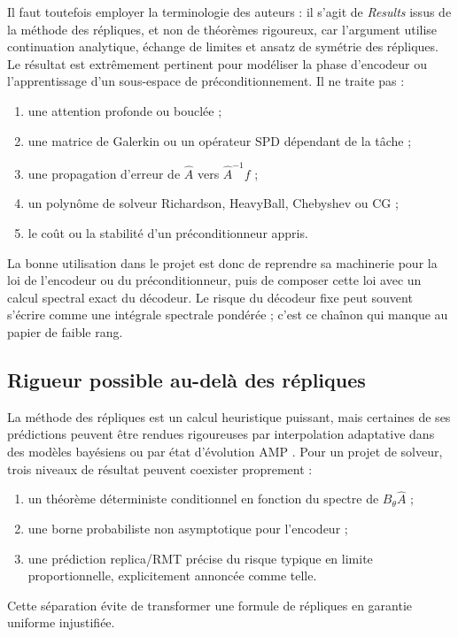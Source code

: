 \documentclass[11pt,a4paper]{article}
\begin{document}
Il faut toutefois employer la terminologie des auteurs : il s'agit de
\emph{Results} issus de la méthode des répliques, et non de théorèmes rigoureux,
car l'argument utilise continuation analytique, échange de limites et ansatz de
symétrie des répliques. Le résultat est extrêmement pertinent pour modéliser la
phase d'encodeur ou l'apprentissage d'un sous-espace de préconditionnement. Il
ne traite pas :
\begin{enumerate}[leftmargin=*]
  \item une attention profonde ou bouclée ;
  \item une matrice de Galerkin ou un opérateur SPD dépendant de la tâche ;
  \item une propagation d'erreur de $\widehat A$ vers $\widehat A^{-1}f$ ;
  \item un polynôme de solveur Richardson, HeavyBall, Chebyshev ou CG ;
  \item le coût ou la stabilité d'un préconditionneur appris.
\end{enumerate}

La bonne utilisation dans le projet est donc de reprendre sa machinerie pour
la loi de l'encodeur ou du préconditionneur, puis de composer cette loi avec un
calcul spectral exact du décodeur. Le risque du décodeur fixe peut souvent
s'écrire comme une intégrale spectrale pondérée ; c'est ce chaînon qui manque
au papier de faible rang.

\subsection{Rigueur possible au-delà des répliques}

La méthode des répliques est un calcul heuristique puissant, mais certaines de
ses prédictions peuvent être rendues rigoureuses par interpolation adaptative
dans des modèles bayésiens ou par état d'évolution AMP
\cite{barbier2019adaptive,bayati2011amp}. Pour un projet de solveur, trois
niveaux de résultat peuvent coexister proprement :
\begin{enumerate}[leftmargin=*]
  \item un théorème déterministe conditionnel en fonction du spectre de
  $B_\theta\widehat A$ ;
  \item une borne probabiliste non asymptotique pour l'encodeur ;
  \item une prédiction replica/RMT précise du risque typique en limite
  proportionnelle, explicitement annoncée comme telle.
\end{enumerate}
Cette séparation évite de transformer une formule de répliques en garantie
uniforme injustifiée.
\end{document}
